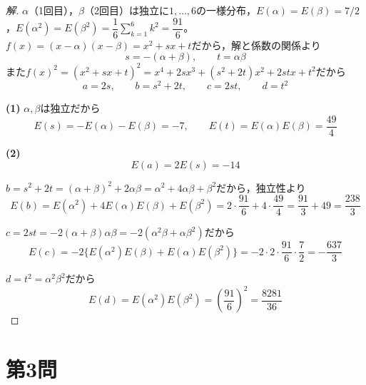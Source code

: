 \documentclass[../main.tex]{subfiles}
\begin{document}
\begin{proof}[解]
  $\alpha$（1回目），$\beta$（2回目）は独立に$1,\dots,6$の一様分布，$E(\alpha)=E(\beta)=7/2$，$E(\alpha^2)=E(\beta^2)=\dfrac16\displaystyle\sum_{k=1}^6k^2=\dfrac{91}6$。$f(x)=(x-\alpha)(x-\beta)=x^2+sx+t$だから，解と係数の関係より
  \[
    s=-(\alpha+\beta),\qquad t=\alpha\beta
  \]
  また$f(x)^2=(x^2+sx+t)^2=x^4+2sx^3+(s^2+2t)x^2+2stx+t^2$だから
  \[
    a=2s,\qquad b=s^2+2t,\qquad c=2st,\qquad d=t^2
  \]

  \textbf{(1)} $\alpha,\beta$は独立だから
  \[
    E(s)=-E(\alpha)-E(\beta)=-7,\qquad E(t)=E(\alpha)E(\beta)=\frac{49}4
  \]

  \textbf{(2)}
  \[
    E(a)=2E(s)=-14
  \]

  $b=s^2+2t=(\alpha+\beta)^2+2\alpha\beta=\alpha^2+4\alpha\beta+\beta^2$だから，独立性より
  \[
    E(b)=E(\alpha^2)+4E(\alpha)E(\beta)+E(\beta^2)=2\cdot\frac{91}6+4\cdot\frac{49}4=\frac{91}3+49=\frac{238}3
  \]

  $c=2st=-2(\alpha+\beta)\alpha\beta=-2(\alpha^2\beta+\alpha\beta^2)$だから
  \[
    E(c)=-2\bigl\{E(\alpha^2)E(\beta)+E(\alpha)E(\beta^2)\bigr\}=-2\cdot2\cdot\frac{91}6\cdot\frac72=-\frac{637}3
  \]

  $d=t^2=\alpha^2\beta^2$だから
  \[
    E(d)=E(\alpha^2)E(\beta^2)=\left(\frac{91}6\right)^2=\frac{8281}{36}
  \]
\end{proof}

\newpage

\section*{第3問}
\end{document}
